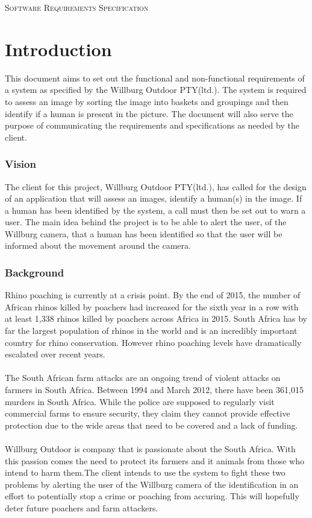 \documentclass[a4paper,12pt]{report}
\begin{document}
\renewcommand{\thesection}{\arabic{section}}
\newpage
\begin{center}
\textsc{\LARGE Software Requirements Specification}\\[1.5cm]
\end{center}



\section{Introduction}
This document aims to set out the functional and non-functional requirements of a system as specified by the Willburg Outdoor PTY(ltd.). The system is required to assess an image by sorting the image into baskets and groupings and then identify if a human is present in the picture. The document will also serve the purpose of communicating the requirements and specifications as needed by the client.

 \subsubsection{Vision}
 The client for this project, Willburg Outdoor PTY(ltd.), has called for the design of an application that will assess an images, identify a human(s) in the image. If a human has been identified by the system, a call must then be set out to warn a user. The main idea behind the project is to be able to alert the user, of the Willburg camera, that a human has been identified so that the user will be informed about the movement around the camera.

\subsubsection{Background}
Rhino poaching is currently at a crisis point. By the end of 2015, the number of African rhinos killed by poachers had increased for the sixth year in a row with at least 1,338 rhinos killed by poachers across Africa in 2015. South Africa has by far the largest population of rhinos in the world and is an incredibly important country for rhino conservation. However rhino poaching levels have dramatically escalated over recent years. \\
\\The South African farm attacks are an ongoing trend of violent attacks on farmers in South Africa. Between 1994 and March 2012, there have been 361,015 murders in South Africa. While the police are supposed to regularly visit commercial farms to ensure security, they claim they cannot provide effective protection due to the wide areas that need to be covered and a lack of funding.\\
\\Willburg Outdoor is company that is passionate about the South Africa. With this passion comes the need to protect its farmers and it animals from those who intend to harm them.The client intends to use the system to fight these two problems by alerting the user of the Willburg camera of the identification in an effort to potentially stop a crime or poaching from accuring. This will hopefully deter future poachers and farm attackers.
	
\end{document}
